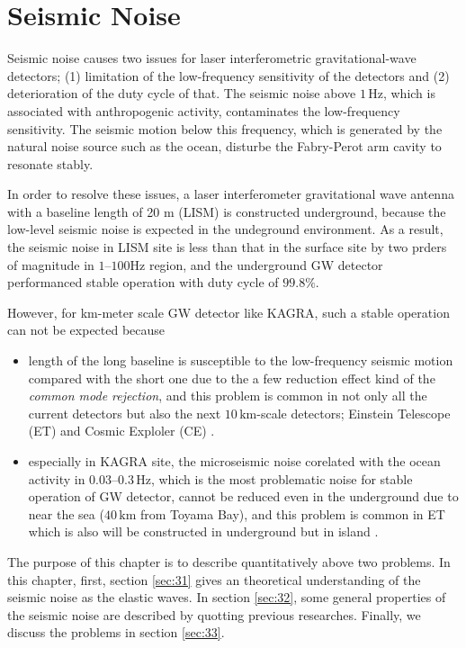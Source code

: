 \chapter{Seismic Noise}
Seismic noise causes two issues for laser interferometric gravitational-wave detectors; (1) limitation of the low-frequency sensitivity of the detectors and (2) deterioration of the duty cycle of that. The seismic noise above $1\,\mathrm{Hz}$, which is associated with anthropogenic activity, contaminates the low-frequency sensitivity. The seismic motion below this frequency, which is generated by the natural noise source such as the ocean, disturbe the Fabry-Perot arm cavity to resonate stably.

In order to resolve these issues, a laser interferometer gravitational wave antenna with a baseline length of 20 m (LISM) \cite{sato2004ultrastable} is constructed underground, because the low-level seismic noise is expected in the undeground environment. As a result, the seismic noise in LISM site is less than that in the surface site by two prders of magnitude in $1$--$100\mathrm{Hz}$ region, and the underground GW detector performanced stable operation with duty cycle of $99.8 \%$.

However, for km-meter scale GW detector like KAGRA, such a stable operation can not be expected because
\begin{itemize}
  \setlength{\itemsep}{1pt}      %
  \setlength{\parskip}{-1pt}     %
  \setlength{\itemindent}{0pt}   %
  \setlength{\labelsep}{5pt}     %
\item length of the long baseline is susceptible to the low-frequency seismic motion compared with the short one due to the a few reduction effect kind of the {\it common mode rejection}, and this problem is common in not only all the current detectors but also the next $10\,\mathrm{km}$-scale detectors; Einstein Telescope (ET)\cite{punturo2010einstein} and Cosmic Exploler (CE) \cite{abbott2017exploring}.
\item especially in KAGRA site, the microseismic noise corelated with the ocean activity in $0.03$--$0.3\,\mathrm{Hz}$, which is the most problematic noise for stable operation of GW detector, cannot be reduced even in the underground due to near the sea ($40\,\mathrm{km}$ from Toyama Bay), and this problem is common in ET which is also will be constructed in underground but in island \cite{naticchioni2014microseismic}.
\end{itemize}
The purpose of this chapter is to describe quantitatively above two problems. In this chapter, first, section \cref{sec:31} gives an theoretical understanding of the seismic noise as the elastic waves. In section \cref{sec:32}, some general properties of the seismic noise are described by quotting previous researches. Finally, we discuss the problems in section \cref{sec:33}.



